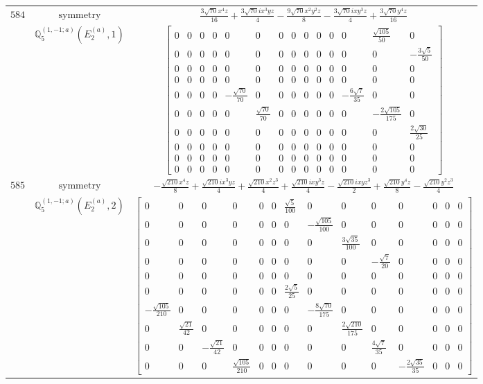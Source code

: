 \documentclass[fleqn,8pt,landscape]{jsarticle}
\begin{document}
\begin{longtable}{ccc}
$ 584 $ & $ \text{symmetry} $ & $ \frac{3 \sqrt{70} x^{4} z}{16} + \frac{3 \sqrt{70} i x^{3} y z}{4} - \frac{9 \sqrt{70} x^{2} y^{2} z}{8} - \frac{3 \sqrt{70} i x y^{3} z}{4} + \frac{3 \sqrt{70} y^{4} z}{16} $ \\
$  $ & $ \mathbb{Q}_{5}^{(1,-1;a)}(E_{2}^{(a)},1) $ & $ \begin{bmatrix} 0 & 0 & 0 & 0 & 0 & 0 & 0 & 0 & 0 & 0 & 0 & 0 & \frac{\sqrt{105}}{50} & 0 \\ 0 & 0 & 0 & 0 & 0 & 0 & 0 & 0 & 0 & 0 & 0 & 0 & 0 & - \frac{3 \sqrt{5}}{50} \\ 0 & 0 & 0 & 0 & 0 & 0 & 0 & 0 & 0 & 0 & 0 & 0 & 0 & 0 \\ 0 & 0 & 0 & 0 & 0 & 0 & 0 & 0 & 0 & 0 & 0 & 0 & 0 & 0 \\ 0 & 0 & 0 & 0 & - \frac{\sqrt{70}}{70} & 0 & 0 & 0 & 0 & 0 & 0 & - \frac{6 \sqrt{7}}{35} & 0 & 0 \\ 0 & 0 & 0 & 0 & 0 & \frac{\sqrt{70}}{70} & 0 & 0 & 0 & 0 & 0 & 0 & - \frac{2 \sqrt{105}}{175} & 0 \\ 0 & 0 & 0 & 0 & 0 & 0 & 0 & 0 & 0 & 0 & 0 & 0 & 0 & \frac{2 \sqrt{30}}{25} \\ 0 & 0 & 0 & 0 & 0 & 0 & 0 & 0 & 0 & 0 & 0 & 0 & 0 & 0 \\ 0 & 0 & 0 & 0 & 0 & 0 & 0 & 0 & 0 & 0 & 0 & 0 & 0 & 0 \\ 0 & 0 & 0 & 0 & 0 & 0 & 0 & 0 & 0 & 0 & 0 & 0 & 0 & 0 \end{bmatrix} $ \\ \hline
$ 585 $ & $ \text{symmetry} $ & $ - \frac{\sqrt{210} x^{4} z}{8} + \frac{\sqrt{210} i x^{3} y z}{4} + \frac{\sqrt{210} x^{2} z^{3}}{4} + \frac{\sqrt{210} i x y^{3} z}{4} - \frac{\sqrt{210} i x y z^{3}}{2} + \frac{\sqrt{210} y^{4} z}{8} - \frac{\sqrt{210} y^{2} z^{3}}{4} $ \\
$  $ & $ \mathbb{Q}_{5}^{(1,-1;a)}(E_{2}^{(a)},2) $ & $ \begin{bmatrix} 0 & 0 & 0 & 0 & 0 & 0 & \frac{\sqrt{5}}{100} & 0 & 0 & 0 & 0 & 0 & 0 & 0 \\ 0 & 0 & 0 & 0 & 0 & 0 & 0 & - \frac{\sqrt{105}}{100} & 0 & 0 & 0 & 0 & 0 & 0 \\ 0 & 0 & 0 & 0 & 0 & 0 & 0 & 0 & \frac{3 \sqrt{35}}{100} & 0 & 0 & 0 & 0 & 0 \\ 0 & 0 & 0 & 0 & 0 & 0 & 0 & 0 & 0 & - \frac{\sqrt{7}}{20} & 0 & 0 & 0 & 0 \\ 0 & 0 & 0 & 0 & 0 & 0 & 0 & 0 & 0 & 0 & 0 & 0 & 0 & 0 \\ 0 & 0 & 0 & 0 & 0 & 0 & \frac{2 \sqrt{5}}{25} & 0 & 0 & 0 & 0 & 0 & 0 & 0 \\ - \frac{\sqrt{105}}{210} & 0 & 0 & 0 & 0 & 0 & 0 & - \frac{8 \sqrt{70}}{175} & 0 & 0 & 0 & 0 & 0 & 0 \\ 0 & \frac{\sqrt{21}}{42} & 0 & 0 & 0 & 0 & 0 & 0 & \frac{2 \sqrt{210}}{175} & 0 & 0 & 0 & 0 & 0 \\ 0 & 0 & - \frac{\sqrt{21}}{42} & 0 & 0 & 0 & 0 & 0 & 0 & \frac{4 \sqrt{7}}{35} & 0 & 0 & 0 & 0 \\ 0 & 0 & 0 & \frac{\sqrt{105}}{210} & 0 & 0 & 0 & 0 & 0 & 0 & - \frac{2 \sqrt{35}}{35} & 0 & 0 & 0 \end{bmatrix} $ \\ \hline

\end{longtable}
\end{document}
